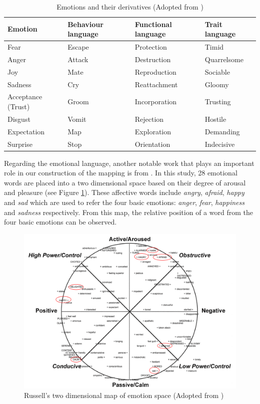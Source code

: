 \begin{table}[htb!]
\caption{Emotions and their derivatives (Adopted from \citet{plutchik2001integration})}
\label{table:derivationOfEmotion}
\centering
\begin{tabular}{|p{3cm}|p{3cm}|p{3cm}|p{3cm}|}
\hline
\textbf{Emotion} & \textbf{Behaviour language} & \textbf{Functional language} & \textbf{Trait language} \\ \hline \hline
Fear & Escape & Protection & Timid \\ \hline
Anger & Attack & Destruction & Quarrelsome \\ \hline
Joy & Mate & Reproduction & Sociable \\ \hline
Sadness & Cry & Reattachment & Gloomy \\ \hline
Acceptance (Trust) & Groom & Incorporation & Trusting \\ \hline
Disgust & Vomit & Rejection & Hostile \\ \hline
Expectation & Map & Exploration & Demanding \\ \hline
Surprise & Stop & Orientation & Indecisive \\ \hline
\end{tabular}
\end{table}

Regarding the emotional language, another notable work that plays an important role in our construction of the mapping is from \citet{russell1980circumplex}. In this study, 28 emotional words are placed into a two dimensional space based on their degree of arousal and pleasure (see Figure \ref{fig:emotionSpace}). These affective words include \textit{angry}, \textit{afraid}, \textit{happy} and \textit{sad} which are used to refer the four basic emotions: \textit{anger}, \textit{fear}, \textit{happiness} and \textit{sadness} respectively. From this map, the relative position of a word from the four basic emotions can be observed.

\begin{figure}[htb!] 
\centering    
\includegraphics[width=1.0\textwidth]{EmotionSpace}
\caption{Russell's two dimensional map of emotion space (Adopted from \citet{scherer2005emotions})}
\label{fig:emotionSpace}
\end{figure}

